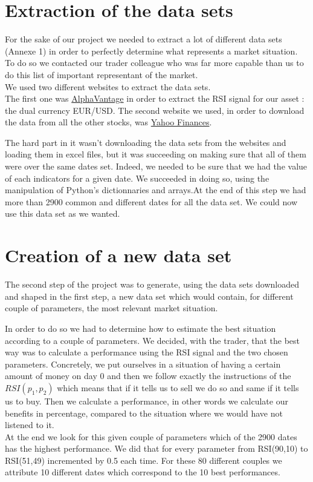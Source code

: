 \documentclass[]{article}
\begin{document}
\section{Extraction of the data sets}

\vskip 0.3cm
For the sake of our project we needed to extract a lot of different data sets (Annexe 1) in order to perfectly determine what represents a market situation. To do so we contacted our trader colleague who was far more capable than us to do this list of important representant of the market.\\
We used two different websites to extract the data sets.\\
The first one was \href{https://www.alphavantage.co/}{AlphaVantage} in order to extract the RSI signal for our asset : the dual currency EUR/USD.
The second website we used, in order to download the data from all the other stocks, was \href{https://fr.finance.yahoo.com/}{Yahoo Finances}. 

\vskip 0.3cm
The hard part in it wasn't downloading the data sets from the websites and loading them in excel files, but it was succeeding on making sure that all of them were over the same dates set. Indeed, we needed to be sure that we had the value of each indicators for a given date. We succeeded in doing so, using the manipulation of Python's dictionnaries and arrays.At the end of this step we had more than 2900 common and different dates for all the data set. We could now use this data set as we wanted.

\section{Creation of a new data set}

\vskip 0.3cm
The second step of the project was to generate, using the data sets downloaded and shaped in the first step, a new data set which would contain, for different couple of parameters, the most relevant market situation.

\vskip 0.3cm
In order to do so we had to determine how to estimate the best situation according to a couple of parameters. We decided, with the trader, that the best way was to calculate a performance using the RSI signal and the two chosen parameters. Concretely, we put ourselves in a situation of having a certain amount of money on day 0 and then we follow exactly the instructions of the \(RSI(p_1,p_2)\) which means that if it tells us to sell we do so and same if it tells us to buy. Then we calculate a performance, in other words we calculate our benefits in percentage, compared to the situation where we would have not listened to it.\\
At the end we look for this given couple of parameters which of the 2900 dates has the highest performance. We did that for every parameter from RSI(90,10) to RSI(51,49) incremented by 0.5 each time. For these 80 different couples we attribute 10 different dates which correspond to the 10 best performances. 
\end{document}
